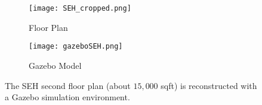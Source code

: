 \begin{figure}[!t]
\centering
    	\begin{subfigure}[t]{0.4\columnwidth}
           	\centering
          	\texttt{[image: SEH\_cropped.png]}
        		\caption{Floor Plan}
    	\end{subfigure}
	\hspace*{0.1\textwidth}
    	\begin{subfigure}[t]{0.4\columnwidth}
           	\centering
          	\texttt{[image: gazeboSEH.png]}
        		\caption{Gazebo Model}
    	\end{subfigure}
	\caption{The SEH second floor plan (about $15,000$ sqft) is reconstructed with a Gazebo simulation environment.}
	\label{fig:SEHEnvironment}
\end{figure}




